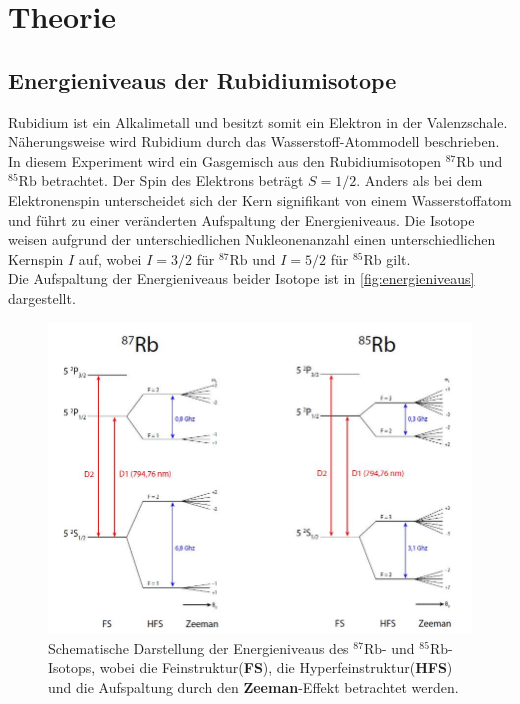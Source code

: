 \section{Theorie}
\label{sec:Theorie}

\subsection{Energieniveaus der Rubidiumisotope}
\label{sec:aufspaltung}
Rubidium ist ein Alkalimetall und besitzt somit ein Elektron in der Valenzschale.
Näherungsweise wird Rubidium durch das Wasserstoff-Atommodell beschrieben.
In diesem Experiment wird ein Gasgemisch aus den Rubidiumisotopen $^{87}\text{Rb}$ und $^{85}\text{Rb}$ betrachtet.
Der Spin des Elektrons beträgt $S=1/2$.
Anders als bei dem Elektronenspin unterscheidet sich der Kern signifikant von einem Wasserstoffatom und führt zu einer veränderten Aufspaltung der Energieniveaus.
Die Isotope weisen aufgrund der unterschiedlichen Nukleonenanzahl einen unterschiedlichen Kernspin $I$ auf, wobei $I=3/2$ für $^{87}\text{Rb}$ und $I=5/2$ für $^{85}\text{Rb}$ gilt.
\\
Die Aufspaltung der Energieniveaus beider Isotope ist in \autoref{fig:energieniveaus} dargestellt.
\begin{figure}
    \centering
    \includegraphics[width=1\textwidth]{content/img/energieniveaus2.png}
    \caption{Schematische Darstellung der Energieniveaus des $^{87}\text{Rb}$- und $^{85}\text{Rb}$-Isotops, 
    wobei die Feinstruktur(\textbf{FS}), die Hyperfeinstruktur(\textbf{HFS}) und die Aufspaltung durch den \textbf{Zeeman}-Effekt betrachtet werden. \cite{borgo}}
    \label{fig:energieniveaus}
\end{figure}

